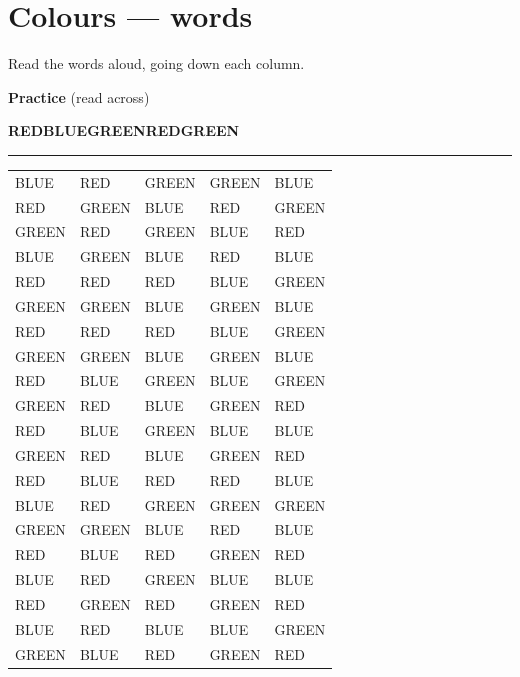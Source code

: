 \documentclass[12pt,a4paper]{article}
\begin{document}
\section*{Colours --- words}{\large Read the words aloud, going down each column.}
\par\medskip\textbf{Practice} (read across)\begin{center}\sffamily\Large\bfseries RED\qquad BLUE\qquad GREEN\qquad RED\qquad GREEN\end{center}\vspace{-4pt}\hrule\vspace{4pt}
\begin{center}\sffamily\Large\bfseries\begin{tabular}{@{}*{5}{p{2.6cm}<{\centering}}@{}}
BLUE & RED & GREEN & GREEN & BLUE\\[3pt]
RED & GREEN & BLUE & RED & GREEN\\[3pt]
GREEN & RED & GREEN & BLUE & RED\\[3pt]
BLUE & GREEN & BLUE & RED & BLUE\\[3pt]
RED & RED & RED & BLUE & GREEN\\[3pt]
GREEN & GREEN & BLUE & GREEN & BLUE\\[3pt]
RED & RED & RED & BLUE & GREEN\\[3pt]
GREEN & GREEN & BLUE & GREEN & BLUE\\[3pt]
RED & BLUE & GREEN & BLUE & GREEN\\[3pt]
GREEN & RED & BLUE & GREEN & RED\\[3pt]
RED & BLUE & GREEN & BLUE & BLUE\\[3pt]
GREEN & RED & BLUE & GREEN & RED\\[3pt]
RED & BLUE & RED & RED & BLUE\\[3pt]
BLUE & RED & GREEN & GREEN & GREEN\\[3pt]
GREEN & GREEN & BLUE & RED & BLUE\\[3pt]
RED & BLUE & RED & GREEN & RED\\[3pt]
BLUE & RED & GREEN & BLUE & BLUE\\[3pt]
RED & GREEN & RED & GREEN & RED\\[3pt]
BLUE & RED & BLUE & BLUE & GREEN\\[3pt]
GREEN & BLUE & RED & GREEN & RED\\[3pt]
\end{tabular}\end{center}\clearpage
\end{document}
